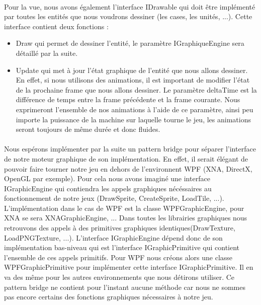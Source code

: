 		\paragraph{}
		Pour la vue, nous avons également l'interface IDrawable qui doit être implémenté par toutes les entités que nous voudrons dessiner (les cases, les unités, ...). 
		Cette interface contient deux fonctions :
		\begin{itemize}		
		\item Draw qui permet de dessiner l'entité, le paramètre IGraphiqueEngine sera détaillé par la suite.
		\item Update qui met à jour l'état graphique de l'entité que nous allons dessiner. En effet, si nous utilisons des animations, il est important de modifier l'état de la prochaine frame que nous allons dessiner.
		Le paramètre deltaTime est la différence de temps entre la frame précédente et la frame courante. Nous exprimeront l'ensemble de nos animations à l'aide de ce paramètre, ainsi peu importe la puissance de la machine
		sur laquelle tourne le jeu, les animations seront toujours de même durée et donc fluides.
		\end{itemize}
		\paragraph{}
			Nous espérons implémenter par la suite un pattern bridge pour séparer l'interface de notre moteur graphique de son implémentation. 
		En effet, il serait élégant de pouvoir faire tourner notre jeu en dehors de l'environnent WPF (XNA, DirectX, OpenGL par exemple).
		Pour cela nous avons imaginé une interface IGraphicEngine qui contiendra les appels graphiques nécéssaires au fonctionnement de notre jeux (DrawSprite, CreateSprite, LoadTile, ...).
		L'implémentation dans le cas de WPF est la classe WPFGraphicEngine, pour XNA se sera XNAGraphicEngine, ...
		Dans toutes les librairies graphiques nous retrouvons des appels à des primitives graphiques identiques(DrawTexture, LoadPNGTexture, ...). 
			L'interface IGraphicEngine dépend donc de son implémentation bas-niveau qui est l'interface IGraphicPrimitive qui contient l'ensemble de ces appels primitifs.
		Pour WPF nous créons alors une classe WPFGraphicPrimitive pour implémenter cette interface IGraphicPrimitive. Il en va des même pour les autres environnements que nous détirons utiliser.
		Ce pattern bridge ne contient pour l'instant aucune méthode car nous ne sommes pas encore certains des fonctions graphiques nécessaires à notre jeu.

